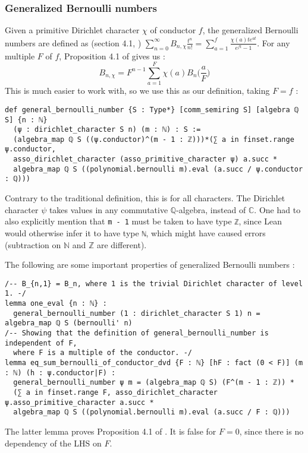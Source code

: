 \documentclass[a4paper,UKenglish,cleveref, autoref, thm-restate]{lipics-v2021}
\newcommand{\lean}[1]{\texttt{#1}\xspace} %
\begin{document}
\subsubsection{Generalized Bernoulli numbers}
Given a primitive Dirichlet character $\chi$ of conductor $f$, the generalized Bernoulli numbers are defined as (section 4.1, \cite{cyc}) 
$ \sum_{n = 0}^{\infty} B_{n,\chi} \frac{t^n}{n!} = \sum_{a = 1}^f \frac{\chi(a)t e^{at}}{e^{ft} - 1} $. 
For any multiple $F$ of $f$, Proposition 4.1 of \cite{cyc} gives us : 
$$ B_{n, \chi} = F^{n - 1} \sum_{a = 1}^{F} \chi (a) B_n \bigg( \frac{a}{F} \bigg) $$
This is much easier to work with, so we use this as our definition, taking $F = f$ :
\begin{lstlisting}
def general_bernoulli_number {S : Type*} [comm_semiring S] [algebra ℚ S] {n : ℕ} 
  (ψ : dirichlet_character S n) (m : ℕ) : S :=
  (algebra_map ℚ S ((ψ.conductor)^(m - 1 : ℤ)))*(∑ a in finset.range ψ.conductor,
  asso_dirichlet_character (asso_primitive_character ψ) a.succ * 
  algebra_map ℚ S ((polynomial.bernoulli m).eval (a.succ / ψ.conductor : ℚ)))
\end{lstlisting}
Contrary to the traditional definition, this is for all characters. The Dirichlet 
character $\psi$ takes values in any commutative $\mathbb{Q}$-algebra, instead of $\mathbb{C}$. 
One had to also explicitly mention that \lean{m - 1} must be taken to have type \lean{ℤ}, since Lean would otherwise infer 
it to have type \lean{ℕ}, which might have caused errors (subtraction on $\mathbb{N}$ 
and $\mathbb{Z}$ are different).

The following are some important properties of generalized Bernoulli numbers : 
\begin{lstlisting}
/-- B_{n,1} = B_n, where 1 is the trivial Dirichlet character of level 1. -/
lemma one_eval {n : ℕ} :
  general_bernoulli_number (1 : dirichlet_character S 1) n = algebra_map ℚ S (bernoulli' n) 
/-- Showing that the definition of general_bernoulli_number is independent of F,
  where F is a multiple of the conductor. -/
lemma eq_sum_bernoulli_of_conductor_dvd {F : ℕ} [hF : fact (0 < F)] (m : ℕ) (h : ψ.conductor|F) : 
  general_bernoulli_number ψ m = (algebra_map ℚ S) (F^(m - 1 : ℤ)) * 
  (∑ a in finset.range F, asso_dirichlet_character ψ.asso_primitive_character a.succ *
  algebra_map ℚ S ((polynomial.bernoulli m).eval (a.succ / F : ℚ))) 
\end{lstlisting}
The latter lemma proves Proposition 4.1 of \cite{cyc}. It is 
false for $F = 0$, since there is no dependency of the LHS on $F$. 
\end{document}
